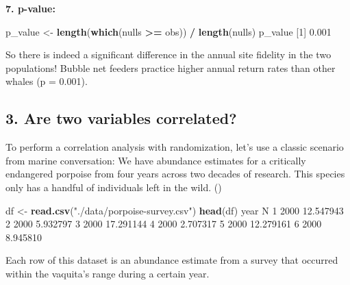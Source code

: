 \documentclass[
]{book}
\newenvironment{Shaded}{\begin{snugshade}}{\end{snugshade}}
\newcommand{\DataTypeTok}[1]{\textcolor[rgb]{0.13,0.29,0.53}{#1}}
\newcommand{\DecValTok}[1]{\textcolor[rgb]{0.00,0.00,0.81}{#1}}
\newcommand{\FloatTok}[1]{\textcolor[rgb]{0.00,0.00,0.81}{#1}}
\newcommand{\KeywordTok}[1]{\textcolor[rgb]{0.13,0.29,0.53}{\textbf{#1}}}
\newcommand{\NormalTok}[1]{#1}
\newcommand{\OperatorTok}[1]{\textcolor[rgb]{0.81,0.36,0.00}{\textbf{#1}}}
\newcommand{\StringTok}[1]{\textcolor[rgb]{0.31,0.60,0.02}{#1}}
\begin{document}
\textbf{7. p-value:}

\begin{Shaded}
\begin{Highlighting}[]
\NormalTok{p_value <-}\StringTok{ }\KeywordTok{length}\NormalTok{(}\KeywordTok{which}\NormalTok{(nulls }\OperatorTok{>=}\StringTok{ }\NormalTok{obs)) }\OperatorTok{/}\StringTok{ }\KeywordTok{length}\NormalTok{(nulls)}
\NormalTok{p_value}
\NormalTok{[}\DecValTok{1}\NormalTok{] }\FloatTok{0.001}
\end{Highlighting}
\end{Shaded}

So there is indeed a significant difference in the annual site fidelity in the two populations! Bubble net feeders practice higher annual return rates than other whales (p = 0.001).

\hypertarget{are-two-variables-correlated}{%
\subsection*{3. Are two variables correlated?}\label{are-two-variables-correlated}}

To perform a correlation analysis with randomization, let's use a classic scenario from marine conversation: We have abundance estimates for a critically endangered porpoise from four years across two decades of research. This species only has a handful of individuals left in the wild. ()

\begin{Shaded}
\begin{Highlighting}[]
\NormalTok{df <-}\StringTok{ }\KeywordTok{read.csv}\NormalTok{(}\StringTok{"./data/porpoise-survey.csv"}\NormalTok{)}
\KeywordTok{head}\NormalTok{(df)}
\NormalTok{  year         N}
\DecValTok{1} \DecValTok{2000} \FloatTok{12.547943}
\DecValTok{2} \DecValTok{2000}  \FloatTok{5.932797}
\DecValTok{3} \DecValTok{2000} \FloatTok{17.291144}
\DecValTok{4} \DecValTok{2000}  \FloatTok{2.707317}
\DecValTok{5} \DecValTok{2000} \FloatTok{12.279161}
\DecValTok{6} \DecValTok{2000}  \FloatTok{8.945810}
\end{Highlighting}
\end{Shaded}

Each row of this dataset is an abundance estimate from a survey that occurred within the vaquita's range during a certain year.

\begin{Shaded}
\end{Shaded}
\end{document}
